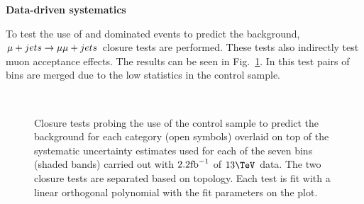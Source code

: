 {\bf Data-driven systematics}

To test the use of \wej and \ttbar dominated \mj events to predict the \znunu
background, $\mj \rightarrow \mmj$ closure tests are performed. These
tests also indirectly test muon acceptance effects. The results can be seen in
Fig.~\ref{fig:closureMuToMuMu}. In this test pairs of \scalht bins are
merged due to the low statistics in the \mmj control sample.

\begin{figure}[h!]
  \begin{center}
    ~~
    \caption{Closure tests probing the use of the \mj control sample
      to predict the \znunu background for each
      \njet category (open symbols) overlaid on top of the systematic
      uncertainty estimates used for each of the seven \scalht bins
      (shaded bands) carried out with $2.2\ifb$ of $13\tev$
      data. The two closure tests are separated based on topology.
      Each test is fit with a linear orthogonal polynomial with the
      fit parameters on the plot.}
    \label{fig:closureMuToMuMu}
  \end{center} 
\end{figure}

